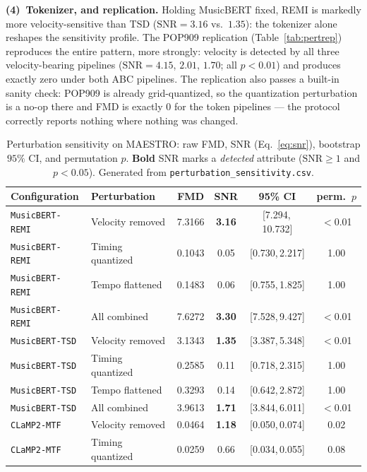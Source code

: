 \documentclass[11pt]{article}
\newcommand{\snr}{\mathrm{SNR}}
\begin{document}
\textbf{(4)~Tokenizer, and replication.} Holding MusicBERT fixed, REMI is
markedly more velocity-sensitive than TSD ($\snr=3.16$ vs.\ $1.35$): the
tokenizer alone reshapes the sensitivity profile. The POP909 replication
(Table~\ref{tab:pertrep}) reproduces the entire pattern, more strongly:
velocity is detected by all three velocity-bearing pipelines
($\snr=4.15$, $2.01$, $1.70$; all $p<0.01$) and produces exactly zero
under both ABC pipelines. The replication also passes a built-in sanity
check: POP909 is already grid-quantized, so the quantization perturbation
is a no-op there and FMD is exactly $0$ for the token pipelines ---
the protocol correctly reports nothing where nothing was changed.

\begin{table}[t]
\centering
\caption{Perturbation sensitivity on MAESTRO: raw FMD, SNR
(Eq.~\ref{eq:snr}), bootstrap $95\%$ CI, and permutation $p$. \textbf{Bold}
SNR marks a \emph{detected} attribute ($\snr\ge1$ and $p<0.05$). Generated
from \texttt{perturbation\_sensitivity.csv}.}
\label{tab:pert}
\small
\begin{tabular}{@{}llcccc@{}}
\toprule
Configuration & Perturbation & FMD & SNR & 95\% CI & perm.\ $p$ \\
\midrule
\texttt{MusicBERT-REMI} & Velocity removed & 7.3166 & \textbf{3.16} & [7.294,\,10.732] & $<$0.01 \\
\texttt{MusicBERT-REMI} & Timing quantized & 0.1043 & {0.05} & [0.730,\,2.217] & 1.00 \\
\texttt{MusicBERT-REMI} & Tempo flattened & 0.1483 & {0.06} & [0.755,\,1.825] & 1.00 \\
\texttt{MusicBERT-REMI} & All combined & 7.6272 & \textbf{3.30} & [7.528,\,9.427] & $<$0.01 \\
\addlinespace
\texttt{MusicBERT-TSD} & Velocity removed & 3.1343 & \textbf{1.35} & [3.387,\,5.348] & $<$0.01 \\
\texttt{MusicBERT-TSD} & Timing quantized & 0.2585 & {0.11} & [0.718,\,2.315] & 1.00 \\
\texttt{MusicBERT-TSD} & Tempo flattened & 0.3293 & {0.14} & [0.642,\,2.872] & 1.00 \\
\texttt{MusicBERT-TSD} & All combined & 3.9613 & \textbf{1.71} & [3.844,\,6.011] & $<$0.01 \\
\addlinespace
\texttt{CLaMP2-MTF} & Velocity removed & 0.0464 & \textbf{1.18} & [0.050,\,0.074] & 0.02 \\
\texttt{CLaMP2-MTF} & Timing quantized & 0.0259 & {0.66} & [0.034,\,0.055] & 0.08 \\

\end{tabular}
\end{table}
\end{document}
